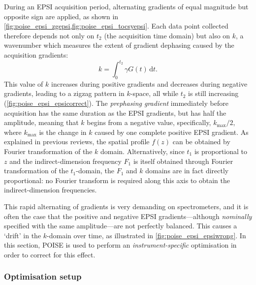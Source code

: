 During an EPSI acquisition period, alternating gradients of equal magnitude but opposite sign are applied, as shown in \cref{fig:poise_epsi_zgepsi,fig:poise_epsi_tocsyepsi}. Each data point collected therefore depends not only on $t_2$ (the acquisition time domain) but also on $k$, a wavenumber which measures the extent of gradient dephasing caused by the acquisition gradients:
\begin{equation}
    \label{eq:epsi_k_space}
    k = \int_0^{t_2} \gamma G(t) \,\mathrm{d}t.
\end{equation}
This value of $k$ increases during positive gradients and decreases during negative gradients, leading to a zigzag pattern in $k$-space, all while $t_2$ is still increasing (\cref{fig:poise_epsi_epsicorrect}).
The \textit{prephasing gradient} immediately before acquisition has the same duration as the EPSI gradients, but has half the amplitude, meaning that $k$ begins from a negative value, specifically, $k_\text{max} / 2$, where $k_\text{max}$ is the change in $k$ caused by one complete positive EPSI gradient.
As explained in previous reviews\autocite{Frydman2003JACS}, the spatial profile $f(z)$ can be obtained by Fourier transformation of the $k$ domain.
Alternatively, since $t_1$ is proportional to $z$ and the indirect-dimension frequency $F_1$ is itself obtained through Fourier transformation of the $t_1$-domain, the $F_1$ and $k$ domains are in fact directly proportional: no Fourier transform is required along this axis to obtain the indirect-dimension frequencies.

This rapid alternating of gradients is very demanding on spectrometers, and it is often the case that the positive and negative EPSI gradients---although \textit{nominally} specified with the same amplitude---are not perfectly balanced.
This causes a `drift' in the $k$-domain over time, as illustrated in \cref{fig:poise_epsi_epsiwrong}.
In this section, POISE is used to perform an \textit{instrument-specific} optimisation in order to correct for this effect.


\subsubsection{Optimisation setup}

